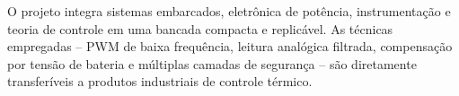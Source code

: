
O projeto integra sistemas embarcados, eletrônica de potência, instrumentação e teoria de
controle em uma bancada compacta e replicável. As técnicas empregadas -- PWM de baixa
frequência, leitura analógica filtrada, compensação por tensão de bateria e múltiplas camadas
de segurança -- são diretamente transferíveis a produtos industriais de controle térmico.



